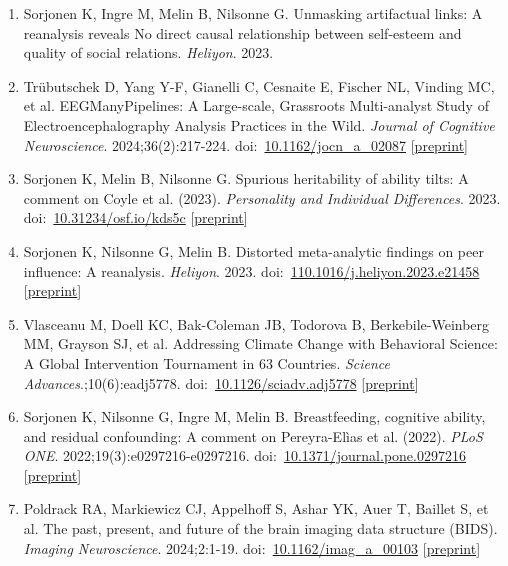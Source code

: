 \documentclass[10pt,a4paper,twocolumn]{article}
\begin{document}
\begin{enumerate}
    \item Sorjonen K, Ingre M, Melin B, Nilsonne G. Unmasking artifactual links: A reanalysis reveals No direct causal relationship between self-esteem and quality of social relations. \textit{Heliyon}. 2023.

    \item Trübutschek D, Yang Y-F, Gianelli C, Cesnaite E, Fischer NL, Vinding MC, et al. EEGManyPipelines: A Large-scale, Grassroots Multi-analyst Study of Electroencephalography Analysis Practices in the Wild. \textit{Journal of Cognitive Neuroscience}. 2024;36(2):217-224. doi:~\href{https://doi.org/10.1162/jocn_a_02087}{10.1162/jocn\_a\_02087} [\href{https://doi.org/10.31222/osf.io/jq342}{preprint}]

    \item Sorjonen K, Melin B, Nilsonne G. Spurious heritability of ability tilts: A comment on Coyle et al. (2023). \textit{Personality and Individual Differences}. 2023. doi:~\href{https://doi.org/10.31234/osf.io/kds5c}{10.31234/osf.io/kds5c} [\href{https://doi.org/10.31234/osf.io/kds5c}{preprint}]

    \item Sorjonen K, Nilsonne G, Melin B. Distorted meta-analytic findings on peer influence: A reanalysis. \textit{Heliyon}. 2023. doi:~\href{https://doi.org/110.1016/j.heliyon.2023.e21458}{110.1016/j.heliyon.2023.e21458} [\href{https://doi.org/10.31234/osf.io/szkt8}{preprint}]

    \item Vlasceanu M, Doell KC, Bak-Coleman JB, Todorova B, Berkebile-Weinberg MM, Grayson SJ, et al. Addressing Climate Change with Behavioral Science: A Global Intervention Tournament in 63 Countries. \textit{Science Advances}.;10(6):eadj5778. doi:~\href{https://doi.org/10.1126/sciadv.adj5778}{10.1126/sciadv.adj5778} [\href{https://doi.org/10.31234/osf.io/cr5at}{preprint}]

    \item Sorjonen K, Nilsonne G, Ingre M, Melin B. Breastfeeding, cognitive ability, and residual confounding: A comment on Pereyra-Elìas et al. (2022). \textit{PLoS ONE}. 2022;19(3):e0297216-e0297216. doi:~\href{https://doi.org/10.1371/journal.pone.0297216}{10.1371/journal.pone.0297216} [\href{https://doi.org/10.31234/osf.io/gkftq}{preprint}]

    \item Poldrack RA, Markiewicz CJ, Appelhoff S, Ashar YK, Auer T, Baillet S, et al. The past, present, and future of the brain imaging data structure (BIDS). \textit{Imaging Neuroscience}. 2024;2:1-19. doi:~\href{https://doi.org/10.1162/imag_a_00103}{10.1162/imag\_a\_00103} [\href{https://doi.org/10.48550/arXiv.2309.05768}{preprint}]


\end{enumerate}
\end{document}
